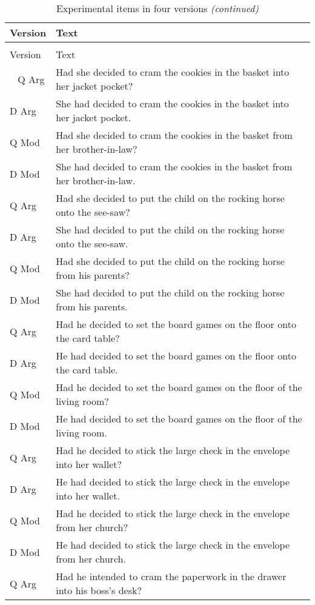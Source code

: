 \documentclass[11pt,oneside]{book}
\begin{document}
\begin{longtable}{ll}
\caption{\label{tab:unnamed-chunk-1}Experimental items in four versions}\\
\toprule
Version & Text\\
\midrule
\endfirsthead
\caption[]{\label{tab:unnamed-chunk-1}Experimental items in four versions \textit{(continued)}}\\
\toprule
Version & Text\\
\midrule
\endhead
\
\endfoot
\bottomrule
\endlastfoot
Q Arg & Had she decided to cram the cookies in the basket into her jacket pocket?\\
D Arg & She had decided to cram the cookies in the basket into her jacket pocket.\\
Q Mod & Had she decided to cram the cookies in the basket from her brother-in-law?\\
D Mod & She had decided to cram the cookies in the basket from her brother-in-law.\\
\addlinespace
Q Arg & Had she decided to put the child on the rocking horse onto the see-saw?\\
D Arg & She had decided to put the child on the rocking horse onto the see-saw.\\
Q Mod & Had she decided to put the child on the rocking horse from his parents?\\
D Mod & She had decided to put the child on the rocking horse from his parents.\\
\addlinespace
Q Arg & Had he decided to set the board games on the floor onto the card table?\\
D Arg & He had decided to set the board games on the floor onto the card table.\\
Q Mod & Had he decided to set the board games on the floor of the living room?\\
D Mod & He had decided to set the board games on the floor of the living room.\\
\addlinespace
Q Arg & Had he decided to stick the large check in the envelope into her wallet?\\
D Arg & He had decided to stick the large check in the envelope into her wallet.\\
Q Mod & Had he decided to stick the large check in the envelope from her church?\\
D Mod & He had decided to stick the large check in the envelope from her church.\\
\addlinespace
Q Arg & Had he intended to cram the paperwork in the drawer into his boss's desk?\\

\end{longtable}
\end{document}
